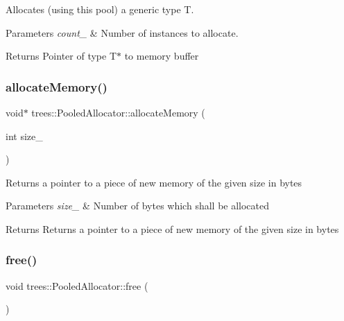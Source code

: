 Allocates (using this pool) a generic type T.


\begin{DoxyParams}{Parameters}
{\em count\+\_\+} & Number of instances to allocate. \\
\hline
\end{DoxyParams}
\begin{DoxyReturn}{Returns}
Pointer of type T$\ast$ to memory buffer 
\end{DoxyReturn}
\mbox{\label{classtrees_1_1_pooled_allocator_a33b64cd726208d57d982d42a7e00e7a0}} 
\subsubsection{\texorpdfstring{allocate\+Memory()}{allocateMemory()}}
{\footnotesize\ttfamily void$\ast$ trees\+::\+Pooled\+Allocator\+::allocate\+Memory (\begin{DoxyParamCaption}\item[{int}]{size\+\_\+ }\end{DoxyParamCaption})\hspace{0.3cm}{\ttfamily [inline]}}

Returns a pointer to a piece of new memory of the given size in bytes


\begin{DoxyParams}{Parameters}
{\em size\+\_\+} & Number of bytes which shall be allocated \\
\hline
\end{DoxyParams}
\begin{DoxyReturn}{Returns}
Returns a pointer to a piece of new memory of the given size in bytes 
\end{DoxyReturn}
\mbox{\label{classtrees_1_1_pooled_allocator_a64a9e64fba5590513fa11ed5ff74e067}} 
\subsubsection{\texorpdfstring{free()}{free()}}
{\footnotesize\ttfamily void trees\+::\+Pooled\+Allocator\+::free (\begin{DoxyParamCaption}{ }\end{DoxyParamCaption})\hspace{0.3cm}{\ttfamily [inline]}}


